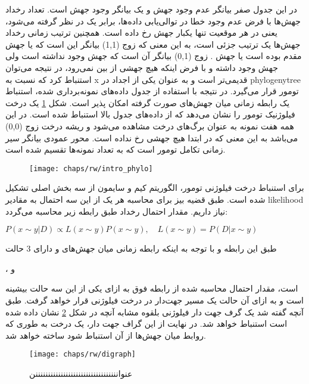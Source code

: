 در این جدول صفر بیانگر عدم وجود جهش و یک بیانگر وجود جهش است. تعداد رخداد جهش‌ها با فرض عدم وجود خطا در توالی‌یابی داده‌ها، برابر یک در نظر گرفته می‌شود، یعنی در هر موقعیت تنها یکبار جهش رخ داده است. همچنین ترتیب زمانی رخداد جهش‌ها یک ترتیب جزئی است، به این معنی که زوج (1,1) بیانگر این است که یا جهش  مقدم بوده است یا جهش . زوج (0,1) بیانگر آن است که جهش  وجود نداشته است ولی جهش  وجود داشته و با فرض اینکه هیچ جهشی از بین نمی‌رود، در نتیجه می‌توان استنباط کرد که  نسبت به x قدیمی‌تر است و به عنوان یکی از اجداد  در \gls{phylogenytree} تومور قرار می‌گیرد. در نتیجه با استفاده از جدول داده‌های نمونه‌برداری شده، استنباط یک رابطه زمانی میان جهش‌های صورت گرفته امکان پذیر است. شکل \ref{fig:ch_rw:intro_phylo} یک درخت فیلوژنیک تومور را نشان می‌دهد که از داده‌های جدول بالا استنباط شده است. در این همه هفت نمونه به عنوان برگ‌های درخت مشاهده می‌شود و ریشه درخت زوج (0,0) می‌باشد به این معنی که در ابتدا هیچ جهشی رخ نداده است. محور عمودی بیانگر سیر زمانی تکامل تومور است که به تعداد نمونه‌ها تقسیم شده است. 


\begin{figure}[!ht]
	\centerline{\texttt{[image: chaps/rw/intro\_phylo]}}
	\caption{}
	\label{fig:ch_rw:intro_phylo}
\end{figure}

برای استنباط درخت فیلوژنی تومور، الگوریتم کیم و سایمون از سه بخش اصلی تشکیل شده است. طبق قضیه بیز برای محاسبه هر یک از این سه احتمال به مقادیر \gls{likelihood}  نیاز داریم. مقدار احتمال رخداد طبق رابطه‌ زیر محاسبه می‌گردد:

\begin{center}
	\begin{math}
		P(x\sim y | D) \propto L(x\sim y)P(x\sim y), \quad L(x\sim y) = P(D|x\sim y)
	\end{math}
\end{center}
طبق این رابطه و با توجه به اینکه رابطه‌ زمانی میان جهش‌های  و  دارای 3 حالت 
\begin{center}
	 ،   و  
\end{center}
است، مقدار احتمال محاسبه شده از رابطه فوق به ازای یکی از این سه حالت بیشینه است و به ازای آن حالت یک مسیر جهت‌دار در درخت فیلوژنی قرار خواهد گرفت. طبق آنچه گفته شد یک گرف جهت دار فیلوژنی بلقوه مشابه آنچه در شکل \ref{fig:ch_rw:digraph} نشان داده ‌شده است استنباط خواهد شد. در نهایت از این گراف جهت دار، یک درخت به طوری که روابط میان جهش‌ها از آن استنباط شود ساخته خواهد شد. 

\begin{figure}[!ht]
	\centerline{\texttt{[image: chaps/rw/digraph]}}
	\caption{عنوانننننننننننننننننننننننننننننننننن}
	\label{fig:ch_rw:digraph}
\end{figure}



